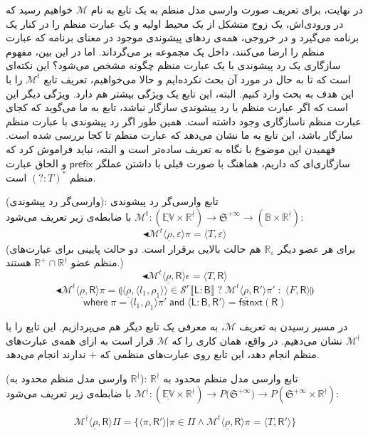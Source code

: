 در نهایت، برای تعریف صورت وارسی مدل منظم به یک تابع به نام $\mathcal{M}$ خواهیم رسید که در ورودی‌اش، یک زوج متشکل از یک محیط اولیه و یک عبارت منظم را در کنار یک برنامه می‌گیرد و در خروجی، همه‌ی ردهای پیشوندی موجود در معنای برنامه که عبارت منظم را ارضا می‌کنند، داخل یک مجموعه بر می‌گرداند.
اما در این بین، مفهوم سازگاری یک رد پیشوندی با یک عبارت منظم چگونه مشخص می‌شود؟ این نکته‌ای است که تا به حال در مورد آن بحث نکرده‌ایم و حالا می‌خواهیم، تعریف تابع $\mathcal{M}^t$ را با این هدف به بحث وارد کنیم. البته، این تابع یک ویژگی بیشتر هم دارد. ویژگی دیگر این است که اگر عبارت منظم با رد پیشوندی سازگار نباشد، تابع به ما می‌گوید که کجای عبارت منظم ناسازگاری وجود داشته است. همین ‌طور اگر رد پیشوندی با عبارت منظم سازگار باشد، این تابع به ما نشان می‌دهد که عبارت منظم تا کجا بررسی شده است. فهمیدن این موضوع با نگاه به تعریف ساده‌تر است و البته، نباید فراموش کرد که سازگاری‌ای که داریم، هماهنگ با صورت قبلی با داشتن عملگر 
$\mathsf{prefix}$
و الحاق عبارت منظم
$\mathsf{(?:\mathit{T})^*}$
است. 
\begin{defn}
	(وارسی‌گر رد پیشوندی): تابع وارسی‌گر رد پیشوندی \break
	$\mathcal{M}^t:\mathbb{(\underline{EV} \times R^\nmid) \rightarrow  \mathfrak{S}^{+\infty}}
	\rightarrow (\mathbb{B \times R^\nmid} ) $
	با ضابطه‌ی زیر تعریف می‌شود:
	$$\blacktriangleleft\mathcal{M}^t \langle \underline{\rho} , \varepsilon \rangle \pi = 
	\langle \mathit{T} , \varepsilon \rangle$$
	(برای هر عضو دیگر $\mathbb{R_\varepsilon}$ هم حالت بالایی برقرار است. دو حالت پایینی برای عبارت‌های منظم عضو $\mathbb{R^+ \cap R^\nmid}$ هستند.)
	$$\blacktriangleleft\mathcal{M}^t \langle \underline{\rho} , \mathsf{R} \rangle \epsilon = 
	\langle \mathit{T} , \mathsf{R} \rangle$$
	$$\blacktriangleleft\mathcal{M}^t \langle \underline{\rho} , \mathsf{R} \rangle \pi = 
	\llparenthesis \langle \underline{\rho}, \langle l_1, \rho_1 \rangle \rangle \in
	\mathcal{S}^r \llbracket \mathsf{L:B} \rrbracket \; ? \; 
	\mathcal{M}^t \langle \underline{\rho}, \mathsf{R'} \rangle \pi' \; : \; 
	\langle \mathit{F}, \mathsf{R} \rangle \rrparenthesis$$
	$$\mathsf{where}\; \pi=\langle l_1,\rho_1\rangle \pi' \;\mathsf{and}\; 
	\langle \mathsf{L:B,R'}\rangle = \mathsf{fstnxt(R)}$$
	
\end{defn}

در مسیر رسیدن به تعریف $\mathcal{M}$، به معرفی یک تابع دیگر هم می‌پردازیم. این تابع را با
 $\mathcal{M}^\nmid$ 
نشان می‌دهیم. در واقع، همان کاری را که $\mathcal{M}$ قرار است به ازای همه‌ی عبارت‌های منظم انجام دهد، این تابع روی عبارت‌های منظمی که $+$ ندارند انجام می‌دهد.
\begin{defn}
	(وارسی مدل منظم محدود به $\mathbb{R^\nmid}$): تابع وارسی مدل منظم محدود به $\mathbb{R^\nmid}$ \break
	$\mathcal{M}^\nmid:\mathbb{(\underline{EV} \times R^\nmid)} \rightarrow  \mathit{P}({\mathfrak{S}^{+\infty})}
	\rightarrow \mathit{P}(\mathfrak{S}^{+\infty} \times \mathbb{R}^\nmid ) $
	با ضابطه‌ی زیر تعریف می‌شود:
	
	 $$\mathcal{M}^\nmid \langle \underline{\rho} , \mathsf{R} \rangle \Pi= \{ \langle \pi , \mathsf{R'} \rangle | \pi \in \Pi \land  
	  \mathcal{M}^t \langle \underline{\rho} , \mathsf{R} \rangle \pi =
	 \langle \mathit{T} , \mathsf{R'} \rangle \}$$
\end{defn}


